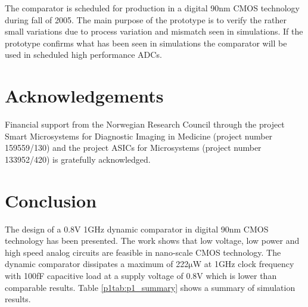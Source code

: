 The comparator is scheduled for production in a digital 90nm CMOS
technology during fall of 2005. The main purpose of the prototype is to
verify the rather small variations due to process variation and
mismatch seen in simulations. If the prototype confirms what has been
seen in simulations the comparator will be used in scheduled high
performance ADCs.
 

\section{Acknowledgements}
Financial support from the Norwegian Research Council through the
project Smart Microsystems for Diagnostic Imaging in Medicine (project
number 159559/130) and the project ASICs for Microsystems (project
number 133952/420) is gratefully acknowledged.
 

\section{Conclusion}
The design of a 0.8V 1GHz dynamic comparator in digital 90nm CMOS
technology has been presented. The work shows that low voltage, low
power and high speed analog circuits are feasible\textit{ }in
nano-scale CMOS technology. The dynamic comparator dissipates a maximum
of 222\begin{math}\mathrm{\mu}\end{math}W at 1GHz clock frequency with
100fF capacitive load at a supply voltage of 0.8V which is lower than
comparable results. Table  \ref{p1tab:p1_summary} shows a summary of simulation results.
 
 



 



 



 




